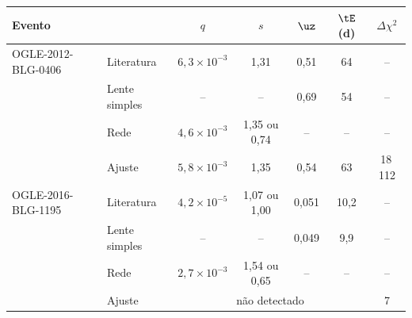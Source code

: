 \begin{tabular}{llccccc}
	\toprule
	Evento & & $q$ & $s$ & $\uz$ & $\tE$ (d) & $\Delta\chi^2$ \\
	\midrule
	OGLE-2012-BLG-0406 & Literatura & $6{,}3 \times 10^{-3}$ & 1,31 & 0,51 & 64 & -- \\
	 & Lente simples & -- & -- & 0{,}69 & 54 & -- \\
	 & Rede & $4{,}6 \times 10^{-3}$ & 1{,}35 ou 0{,}74 & -- & -- & -- \\
	 & Ajuste & $5{,}8 \times 10^{-3}$ & 1{,}35 & 0{,}54 & 63 & 18\,112 \\
	\midrule
	OGLE-2016-BLG-1195 & Literatura & $4{,}2 \times 10^{-5}$ & 1,07 ou 1,00 & 0,051 & 10,2 & -- \\
	 & Lente simples & -- & -- & 0{,}049 & 9{,}9 & -- \\
	 & Rede & $2{,}7 \times 10^{-3}$ & 1{,}54 ou 0{,}65 & -- & -- & -- \\
	 & Ajuste & \multicolumn{4}{c}{não detectado} & 7 \\
	\bottomrule
\end{tabular}

